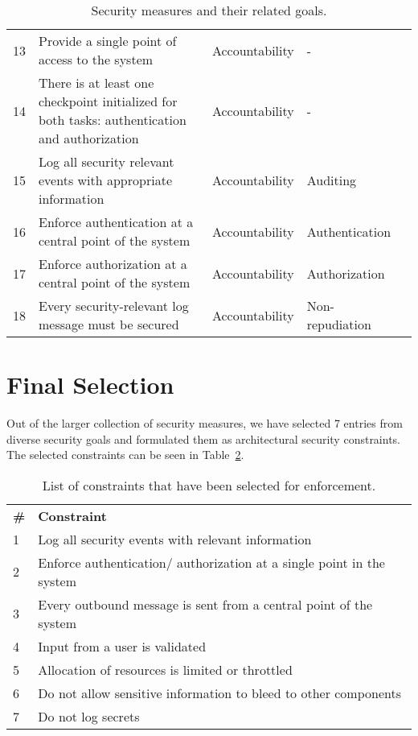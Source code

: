 \begin{table}
\begin{tabular}{lp{7cm}lll}
13 & Provide a single point of access to the system & Accountability & - \\
\rowcolor{RowColor}
14 & There is at least one checkpoint initialized for both tasks: authentication and authorization & Accountability & - \\
15 & Log all security relevant events with appropriate information & Accountability & Auditing \\
\rowcolor{RowColor}
16 & Enforce authentication at a central point of the system & Accountability & Authentication \\
17 & Enforce authorization at a central point of the system & Accountability & Authorization \\
\rowcolor{RowColor}
18 & Every security-relevant log message must be secured & Accountability & Non-repudiation \\
\hline
\end{tabular}
\caption{Security measures and their related goals.}
\label{tab:all_measures}
\end{table}

\section{Final Selection}

Out of the larger collection of security measures, we have selected 7 entries from diverse security goals and formulated them as architectural security constraints. The selected constraints can be seen in Table~\ref{tab:selected_measures}.

\begin{table}
\begin{tabular}{ll}
\hline
\textbf{\#} & \textbf{Constraint} \\
1 & Log all security events with relevant information\\
\rowcolor{RowColor}
2 & Enforce authentication/ authorization at a single point in the system\\
3 & Every outbound message is sent from a central point of the system\\
\rowcolor{RowColor}
4 & Input from a user is validated\\
5 & Allocation of resources is limited or throttled\\
\rowcolor{RowColor}
6 & Do not allow sensitive information to bleed to other components\\
7 & Do not log secrets\\
\hline
\end{tabular}
\caption{List of constraints that have been selected for enforcement.}
\label{tab:selected_measures}
\end{table}

